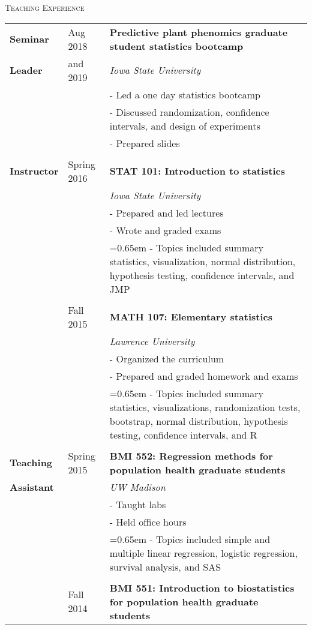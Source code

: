 \documentclass[10pt, oneside]{article}
\begin{document}
\noindent \textsc{Teaching Experience} \hrulefill
\begin{longtable}{p{1.4cm}p{2.1cm}p{13cm}}
\textbf{Seminar} & \hfill{Aug 2018} & \textbf{Predictive plant phenomics graduate student statistics bootcamp}\\
\textbf{Leader} & \hfill{and 2019} & \emph{Iowa State University}\\
& & - Led a one day statistics bootcamp\\
& & - Discussed randomization, confidence intervals, and design of experiments\\
& & - Prepared slides\\
\\
\textbf{Instructor} & \hfill{Spring 2016} & \textbf{STAT 101: Introduction to statistics}\\
& & \emph{Iowa State University}\\
& & - Prepared and led lectures\\
& & - Wrote and graded exams\\
& & \hangindent=0.65em \hangafter=1 - Topics included summary statistics, visualization, normal distribution, hypothesis testing, confidence intervals, and JMP\\
\\
& \hfill{Fall 2015} & \textbf{MATH 107: Elementary statistics}\\
& & \emph{Lawrence University}\\
& & - Organized the curriculum\\
& & - Prepared and graded homework and exams\\
& & \hangindent=0.65em \hangafter=1 - Topics included summary statistics, visualizations, randomization tests, bootstrap, normal distribution, hypothesis testing, confidence intervals, and R\\
\\
\textbf{Teaching} & \hfill{Spring 2015} & \textbf{BMI 552: Regression methods for population health graduate students}\\
\textbf{Assistant} & & \emph{UW Madison}\\
& & - Taught labs\\
& & - Held office hours\\
& & \hangindent=0.65em \hangafter=1 - Topics included simple and multiple linear regression, logistic regression, survival analysis, and SAS\\
\\
& \hfill{Fall 2014} & \textbf{BMI 551: Introduction to biostatistics for population health graduate students}\\

\end{longtable}
\end{document}
